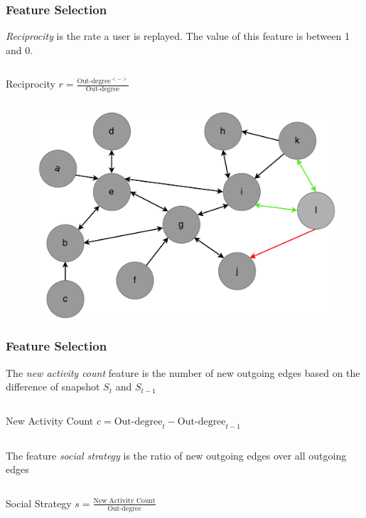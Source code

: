 \begin{frame}
\frametitle{Feature Selection}
\textit{Reciprocity} is the rate a user is replayed. The value of this feature is between 1 and 0.
\begin{columns}\centering
\begin{column}{0.5\textwidth}
	\begin{block}{\small Reciprocity}\centering
		$r = \frac{\text{Out-degree}^{<->}}{\text{Out-degree}}$
	\end{block}
\end{column}
\end{columns}
\begin{figure}
	\includegraphics[scale=0.32]{graphics/directed_network_example_reciprocity.pdf}
\end{figure}

\end{frame}

\begin{frame}
\frametitle{Feature Selection}
The \textit{new activity count} feature is the number of new outgoing edges based on the difference of snapshot $S_t$ and $S_{t-1}$
\begin{columns}\centering
\begin{column}{0.5\textwidth}
	\begin{block}{\small New Activity Count}\centering
		$c = \text{Out-degree}_t - \text{Out-degree}_{t-1}$
	\end{block}
	\end{column}
\end{columns}

The feature \emph{social strategy} is the ratio of new outgoing edges over all outgoing edges
\begin{columns}
\begin{column}{0.5\textwidth}
	\begin{block}{\small Social Strategy}\centering
		$s = \frac{\text{New Activity Count}}{\text{Out-degree}}$
	\end{block}
\end{column}
\end{columns}

\end{frame}

